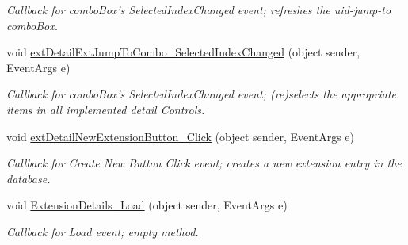 \begin{DoxyCompactItemize}
\begin{DoxyCompactList}\small\item\em Callback for comboBox's SelectedIndexChanged event; refreshes the uid-\/jump-\/to comboBox. \item\end{DoxyCompactList}\item 
void \hyperlink{class_ias_pbx_config_1_1_extension_details_a5acaa568c7925fcb22e39c766849b66e}{extDetailExtJumpToCombo\_\-SelectedIndexChanged} (object sender, EventArgs e)
\begin{DoxyCompactList}\small\item\em Callback for comboBox's SelectedIndexChanged event; (re)selects the appropriate items in all implemented detail Controls. \item\end{DoxyCompactList}\item 
void \hyperlink{class_ias_pbx_config_1_1_extension_details_afe0fc5f796c8ffc1e2efc74b0843ffa4}{extDetailNewExtensionButton\_\-Click} (object sender, EventArgs e)
\begin{DoxyCompactList}\small\item\em Callback for Create New Button Click event; creates a new extension entry in the database. \item\end{DoxyCompactList}\item 
void \hyperlink{class_ias_pbx_config_1_1_extension_details_abdafabf4ec7651b421f5db258fba8d85}{ExtensionDetails\_\-Load} (object sender, EventArgs e)
\begin{DoxyCompactList}\small\item\em Callback for Load event; empty method. \item\end{DoxyCompactList}\end{DoxyCompactItemize}
